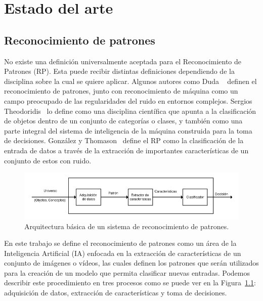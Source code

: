 \chapter[Estado del arte]{Estado del arte}
\label{ch:estado_del_arte}

\section{Reconocimiento de patrones}
\label{sec:rec_patrones}
	No existe una definición universalmente aceptada para el Reconocimiento de Patrones (RP). Esta puede recibir distintas definiciones dependiendo de la disciplina sobre la cual se quiere aplicar. Algunos autores como Duda \etal~\cite{Duda1973} definen el reconocimiento de patrones, junto con reconocimiento de máquina como un campo preocupado de las regularidades del ruido en entornos complejos. Sergios Theodoridis~\cite{Theodoridis2008} lo define como una disciplina científica que apunta a la clasificación de objetos dentro de un conjunto de categorías o clases, y también como una parte integral del sistema de inteligencia de la máquina construida para la toma de decisiones. González y Thomason~\cite{Gonzalez1978} define el RP como la clasificación de la entrada de datos a través de la extracción de importantes características de un conjunto de estos con ruido. 

\begin{figure}[b]
  \centering
   \includegraphics[width=1\textwidth]{Figuras/Diagramas/estado_del_arte/Reconocimiento_de_patrones.png}
  \caption{Arquitectura básica de un sistema de reconocimiento de patrones.}
  \label{art:fig:arquitectura}
\end{figure}


En este trabajo se define el reconocimiento de patrones como un área de la Inteligencia Artificial (IA) enfocada en la extracción de características de un conjunto de imágenes o vídeos, las cuales definen los patrones que serán utilizados para la creación de un modelo que permita clasificar nuevas entradas. Podemos describir este procedimiento en tres procesos como se puede ver en la Figura~\ref{art:fig:arquitectura}: adquisición de datos, extracción de características y toma de decisiones. 

